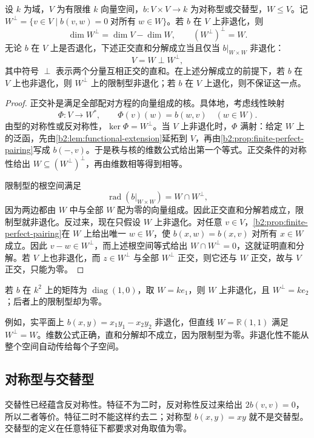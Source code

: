 \begin{theorem}\label{b2:thm:orthogonal-complement}
	设 \(k\) 为域，\(V\) 为有限维 \(k\) 向量空间，\(b:V\times V\to k\) 为对称型或交替型，\(W\le V\)。记 \(W^\perp=\{v\in V\mid b(v,w)=0\;\text{对所有}\;w\in W\}\)。若 \(b\) 在 \(V\) 上非退化，则
	\[
		\dim W^\perp=\dim V-\dim W,\qquad (W^\perp)^\perp=W.
	\]
	无论 \(b\) 在 \(V\) 上是否退化，下述正交直和分解成立当且仅当 \(b|_{W\times W}\) 非退化：
	\[
		V=W\mathbin{\perp}W^\perp,
	\]
	其中符号 \(\perp\) 表示两个分量互相正交的直和。在上述分解成立的前提下，若 \(b\) 在 \(V\) 上也非退化，则 \(W^\perp\) 上的限制型非退化；若 \(b\) 在 \(V\) 上退化，则不保证这一点。
\end{theorem}
\begin{proof}
	正交补是满足全部配对方程的向量组成的核。具体地，考虑线性映射
	\[
		\Phi:V\longrightarrow W^*,\qquad \Phi(v)(w)=b(w,v)\quad(w\in W).
	\]
	由型的对称性或反对称性，\(\ker\Phi=W^\perp\)。当 \(V\) 上非退化时，\(\Phi\) 满射：给定 \(W\) 上的泛函，先由\cref{b2:lem:functional-extension}延拓到 \(V\)，再由\cref{b2:prop:finite-perfect-pairing}写成 \(b(-,v)\)。于是秩与核的维数公式给出第一个等式。正交条件的对称性给出 \(W\subseteq(W^\perp)^\perp\)，再由维数相等得到相等。

	限制型的根空间满足
	\[
		\operatorname{rad}(b|_{W\times W})=W\cap W^\perp,
	\]
	因为两边都由 \(W\) 中与全部 \(W\) 配为零的向量组成。因此正交直和分解若成立，限制型就非退化。反过来，现在只假设 \(W\) 上非退化。对任意 \(v\in V\)，\cref{b2:prop:finite-perfect-pairing}在 \(W\) 上给出唯一 \(w\in W\)，使 \(b(x,w)=b(x,v)\) 对所有 \(x\in W\) 成立。因此 \(v-w\in W^\perp\)，而上述根空间等式给出 \(W\cap W^\perp=0\)，这就证明直和分解。若 \(V\) 上也非退化，而 \(z\in W^\perp\) 与全部 \(W^\perp\) 正交，则它还与 \(W\) 正交，故与 \(V\) 正交，只能为零。
\end{proof}

若 \(b\) 在 \(k^2\) 上的矩阵为 \(\operatorname{diag}(1,0)\)，取 \(W=ke_1\)，则 \(W\) 上非退化，且 \(W^\perp=ke_2\)；后者上的限制型却为零。

\ProseParagraphBreak
例如，实平面上 \(b(x,y)=x_1y_1-x_2y_2\) 非退化，但直线 \(W=\mathbb R(1,1)\) 满足 \(W^\perp=W\)。维数公式正确，直和分解却不成立，因为限制型为零。非退化性不能从整个空间自动传给每个子空间。

\subsection{对称型与交替型}
\label{b2:subsec:1001:02}

交替性已经蕴含反对称性。特征不为二时，反对称性反过来给出 \(2b(v,v)=0\)，所以二者等价。特征二时不能这样约去二；对称型 \(b(x,y)=xy\) 就不是交替型。交替型的定义在任意特征下都要求对角取值为零。

